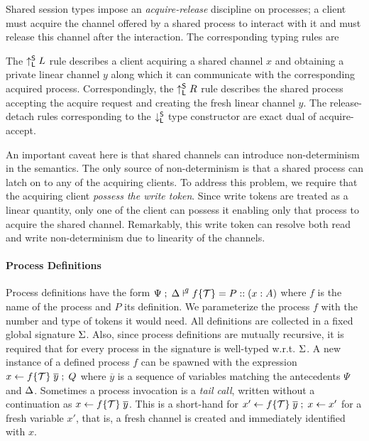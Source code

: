 Shared session types impose an \emph{acquire-release} discipline on processes; 
a client must acquire the channel offered by a shared process to interact with it
and must release this channel after the interaction.
The corresponding typing rules are
The $\up L$ rule describes a client acquiring a shared channel $x$
and obtaining a private linear channel $y$ along which it can communicate
with the corresponding acquired process.
Correspondingly, the $\up R$ rule describes the shared process
accepting the acquire request and creating the fresh linear channel $y$.
The release-detach rules corresponding to the $\down$ type constructor
are exact dual of acquire-accept.

An important caveat here is that shared channels can introduce non-determinism
in the semantics.
The only source of non-determinism is that a shared process can latch on to
any of the acquiring clients.
To address this problem, we require that the acquiring client \emph{possess
the write token}.
Since write tokens are treated as a linear quantity, only one of the client can
possess it enabling only that process to acquire the shared channel.
Remarkably, this write token can resolve both read and write non-determinism
due to linearity of the channels.


\paragraph*{\textbf{Process Definitions}}
Process definitions have the form
$\Psi \semi \D \entailpot{q} f\{\Tokens\} = P :: (x : A)$ where $f$
is the name of the process and $P$ its definition.
We parameterize the process $f$ with the number and type of
tokens it would need.
All definitions are collected in a fixed global signature $\Sg$.
Also, since process definitions are mutually recursive, it is required that
for every process in the signature is well-typed w.r.t. $\Sg$.
A new instance of a defined process $f$ can be spawned with
the expression $\procdef{f\{\Tokens\}}{\overline{y}}{x} \semi Q$
where $\overline{y}$ is a sequence of variables matching the
antecedents $\Psi$ and $\D$.
Sometimes a process invocation is a \emph{tail call}, written without
a continuation as $\procdef{f\{\Tokens\}}{\overline{y}}{x}$.
This is a short-hand for
$\procdef{f\{\Tokens\}}{\overline{y}}{x'} \semi \fwd{x}{x'}$ for a
fresh variable $x'$, that is, a fresh channel is created and
immediately identified with $x$.

